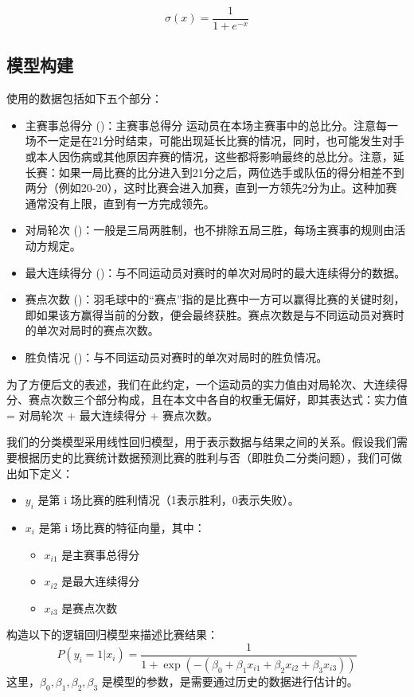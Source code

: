 \documentclass[12pt]{article}
\begin{document}
\begin{equation}
	\sigma(x)=\frac{1}{1+e^{-x}}
\end{equation}


\subsection{模型构建}
使用的数据包括如下五个部分：
\begin{itemize}
	\item 主赛事总得分 ()：主赛事总得分    运动员在本场主赛事中的总比分。注意每一场不一定是在21分时结束，可能出现延长比赛的情况，同时，也可能发生对手或本人因伤病或其他原因弃赛的情况，这些都将影响最终的总比分。注意，延长赛：如果一局比赛的比分进入到21分之后，两位选手或队伍的得分相差不到两分（例如20-20），这时比赛会进入加赛，直到一方领先2分为止。这种加赛通常没有上限，直到有一方完成领先。
	\item 对局轮次 ()：一般是三局两胜制，也不排除五局三胜，每场主赛事的规则由活动方规定。
	\item 最大连续得分 ()：与不同运动员对赛时的单次对局时的最大连续得分的数据。
	\item 赛点次数 ()：羽毛球中的“赛点”指的是比赛中一方可以赢得比赛的关键时刻，即如果该方赢得当前的分数，便会最终获胜。赛点次数是与不同运动员对赛时的单次对局时的赛点次数。
	\item 胜负情况 ()：与不同运动员对赛时的单次对局时的胜负情况。
\end{itemize}

为了方便后文的表述，我们在此约定，一个运动员的实力值由对局轮次、大连续得分、赛点次数三个部分构成，且在本文中各自的权重无偏好，即其表达式：实力值 = 对局轮次 + 最大连续得分 + 赛点次数。


我们的分类模型采用线性回归模型，用于表示数据与结果之间的关系。假设我们需要根据历史的比赛统计数据预测比赛的胜利与否（即胜负二分类问题），我们可做出如下定义：
\begin{itemize}
	\item $y_{i}$ 是第 i 场比赛的胜利情况（1表示胜利，0表示失败）。
	\item $x_{i}$ 是第 i 场比赛的特征向量，其中：
	\begin{itemize}
		\item $x_{i1}$ 是主赛事总得分
		\item $x_{i2}$ 是最大连续得分
		\item $x_{i3}$ 是赛点次数
	\end{itemize}
\end{itemize}
构造以下的逻辑回归模型来描述比赛结果：
\begin{equation}
    P(y_i=1|x_i)=\frac{1}{1+\exp(-(\beta_0+\beta_1x_{i1}+\beta_2x_{i2}+\beta_3x_{i3}))}
\end{equation}
这里，$\beta_0,\beta_1,\beta_2,\beta_3$ 是模型的参数，是需要通过历史的数据进行估计的。
\end{document}

